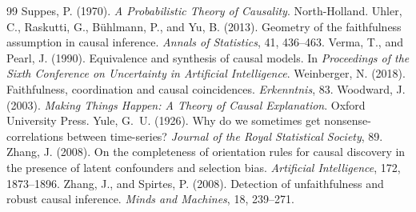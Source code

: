 \documentclass{situationist-preprint}
\begin{document}
\begin{thebibliography}{99}
 Suppes, P. (1970). \emph{A Probabilistic Theory of Causality}. North-Holland.
 Uhler, C., Raskutti, G., B\"uhlmann, P., and Yu, B. (2013). Geometry of the faithfulness assumption in causal inference. \emph{Annals of Statistics}, 41, 436--463.
 Verma, T., and Pearl, J. (1990). Equivalence and synthesis of causal models. In \emph{Proceedings of the Sixth Conference on Uncertainty in Artificial Intelligence}.
 Weinberger, N. (2018). Faithfulness, coordination and causal coincidences. \emph{Erkenntnis}, 83.
 Woodward, J. (2003). \emph{Making Things Happen: A Theory of Causal Explanation}. Oxford University Press.
 Yule, G.~U. (1926). Why do we sometimes get nonsense-correlations between time-series? \emph{Journal of the Royal Statistical Society}, 89.
 Zhang, J. (2008). On the completeness of orientation rules for causal discovery in the presence of latent confounders and selection bias. \emph{Artificial Intelligence}, 172, 1873--1896.
 Zhang, J., and Spirtes, P. (2008). Detection of unfaithfulness and robust causal inference. \emph{Minds and Machines}, 18, 239--271.
\end{thebibliography}
\end{document}
